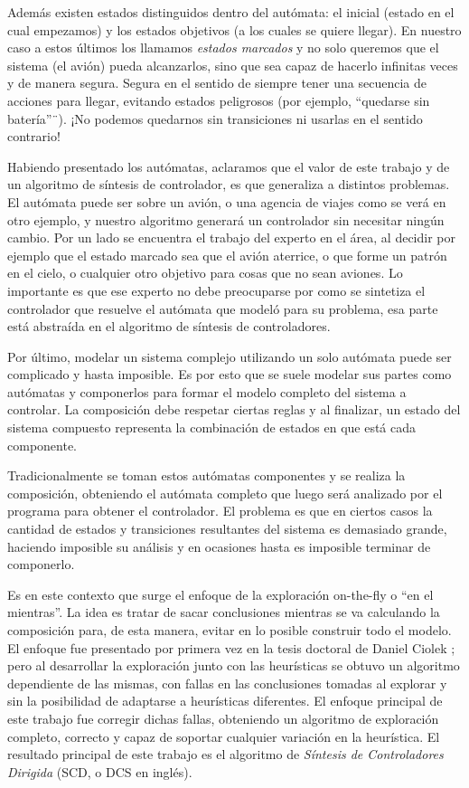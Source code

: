Además existen estados distinguidos dentro del autómata: el inicial (estado en el cual empezamos) y los estados objetivos (a los cuales se quiere llegar). En nuestro caso a estos últimos los llamamos \textit{estados marcados} y no solo queremos que el sistema (el avión) pueda alcanzarlos, sino que sea capaz de hacerlo infinitas veces y de manera segura. Segura en el sentido de siempre tener una secuencia de acciones para llegar, evitando estados peligrosos (por ejemplo, ``quedarse sin batería''¨). ¡No podemos quedarnos sin transiciones ni usarlas en el sentido contrario!

Habiendo presentado los autómatas, aclaramos que el valor de este trabajo y de un algoritmo de síntesis de controlador, es que generaliza a distintos problemas. El autómata puede ser sobre un avión, o una agencia de viajes como se verá en otro ejemplo, y nuestro algoritmo generará un controlador sin necesitar ningún cambio. Por un lado se encuentra el trabajo del experto en el área, al decidir por ejemplo que el estado marcado sea que el avión aterrice, o que forme un patrón en el cielo, o cualquier otro objetivo para cosas que no sean aviones. Lo importante es que ese experto no debe preocuparse por como se sintetiza el controlador que resuelve el autómata que modeló para su problema, esa parte está abstraída en el algoritmo de síntesis de controladores.

Por último, modelar un sistema complejo utilizando un solo autómata puede ser complicado y hasta imposible. Es por esto que se suele modelar sus partes como autómatas y componerlos para formar el modelo completo del sistema a controlar. La composición debe respetar ciertas reglas y al finalizar, un estado del sistema compuesto representa la combinación de estados en que está cada componente.

Tradicionalmente se toman estos autómatas componentes y se realiza la composición, obteniendo el autómata completo que luego será analizado por el programa para obtener el controlador. El problema es que en ciertos casos la cantidad de estados y transiciones resultantes del sistema es demasiado grande, haciendo imposible su análisis y en ocasiones hasta es imposible terminar de componerlo.

Es en este contexto que surge el enfoque de la exploración on-the-fly o ``en el mientras''. La idea es tratar de sacar conclusiones mientras se va calculando la composición para, de esta manera, evitar en lo posible construir todo el modelo. El enfoque fue presentado por primera vez en la tesis doctoral de Daniel Ciolek \cite{tesisDani}; pero al desarrollar la exploración junto con las heurísticas se obtuvo un algoritmo dependiente de las mismas, con fallas en las conclusiones tomadas al explorar y sin la posibilidad de adaptarse a heurísticas diferentes. El enfoque principal de este trabajo fue corregir dichas fallas, obteniendo un algoritmo de exploración completo, correcto y capaz de soportar cualquier variación en la heurística. El resultado principal de este trabajo es el algoritmo de \textit{Síntesis de Controladores Dirigida} (SCD, o DCS en inglés).

